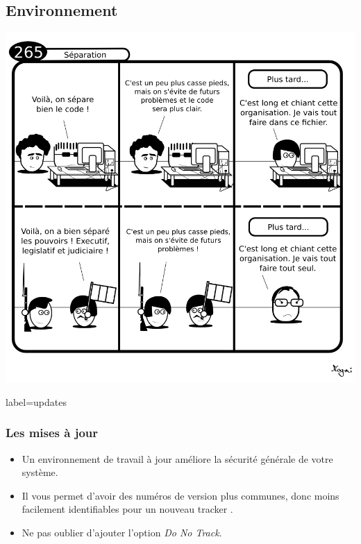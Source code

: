 \documentclass{beamer}
\begin{document}
    \subsection{Environnement}
        \begin{frame}
            \begin{center}
                \includegraphics[scale=0.33]{img/265-separation.png}
            \end{center}
        \end{frame}
        \begin{frame}{label=updates}
            \frametitle{Les mises à jour}
            \begin{center}
                \begin{itemize}
                    \item Un environnement de travail à jour améliore la sécurité générale de votre système.
                    \item Il vous permet d'avoir des numéros de version plus communes, donc moins facilement identifiables pour un nouveau tracker \cite{unique}.
                    \item Ne pas oublier d'ajouter l'option \textit{Do No Track}.
                \end{itemize}
            \end{center}
        \end{frame}
\end{document}
